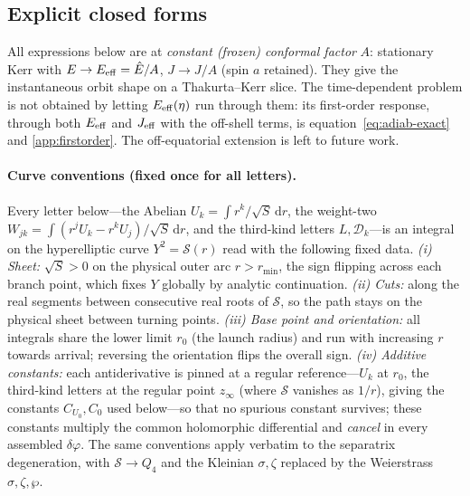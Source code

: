\documentclass[12pt]{iopart}
\theoremstyle{plain}
\theoremstyle{definition}
\theoremstyle{remark}
\newcommand{\Ehat}{\hat E}
\newcommand{\dd}{\mathrm{d}}
\begin{document}
\subsection{Explicit closed forms}
\label{app:explicit}

All expressions below are at \emph{constant (frozen) conformal factor} $A$:
stationary Kerr with $E\to E_{\rm eff}=\Ehat/A$, $J\to J/A$ (spin $a$ retained). They give
the instantaneous orbit shape on a Thakurta--Kerr slice. The time-dependent problem is
not obtained by letting $E_{\rm eff}(\eta)$ run through them: its first-order response,
through both $E_{\rm eff}$ and $J_{\rm eff}$ with the off-shell terms, is
equation~\eqref{eq:adiab-exact} and \ref{app:firstorder}. The off-equatorial extension is left to future work.

\paragraph{Curve conventions (fixed once for all letters).} Every letter
below---the Abelian $U_k=\int r^k/\sqrt S\,\dd r$, the weight-two
$W_{jk}=\int(r^jU_k-r^kU_j)/\sqrt S\,\dd r$, and the third-kind letters $L,\mathcal
D_k$---is an integral on the hyperelliptic curve $Y^2=\mathcal S(r)$ read with the
following fixed data. \emph{(i) Sheet:} $\sqrt S>0$ on the physical outer arc
$r>r_{\min}$, the sign flipping across each branch point, which fixes $Y$ globally by
analytic continuation. \emph{(ii) Cuts:} along the real segments between consecutive
real roots of $\mathcal S$, so the path stays on the physical sheet between turning
points. \emph{(iii) Base point and orientation:} all integrals share the lower limit
$r_0$ (the launch radius) and run with increasing $r$ towards arrival; reversing the
orientation flips the overall sign. \emph{(iv) Additive constants:} each
antiderivative is pinned at a regular reference---$U_k$ at $r_0$, the third-kind
letters at the regular point $z_\infty$ (where $\mathcal S$ vanishes as $1/r$), giving
the constants $C_{U_0},C_0$ used below---so that no spurious constant survives; these
constants multiply the common holomorphic differential and \emph{cancel} in every
assembled $\delta\varphi$. The same conventions apply verbatim to the separatrix
degeneration, with $\mathcal S\to Q_4$ and the Kleinian $\sigma,\zeta$ replaced by the
Weierstrass $\sigma,\zeta,\wp$.
\end{document}
